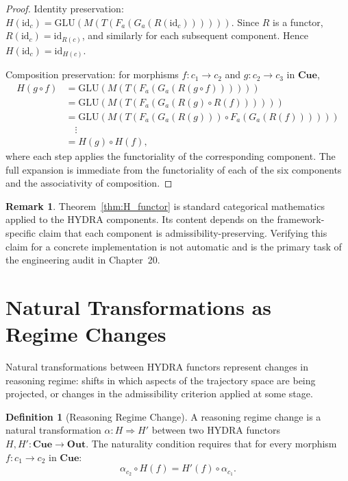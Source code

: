 \documentclass[12pt, oneside]{book}
\theoremstyle{flyxion}
\theoremstyle{definition}
\newtheorem{definition}[theorem]{Definition}
\newtheorem{remark}[theorem]{Remark}
\begin{document}
\begin{proof}
Identity preservation: $H(\mathrm{id}_c) =
\mathrm{GLU}(M(T(F_a(G_a(R(\mathrm{id}_c))))))$.
Since $R$ is a functor, $R(\mathrm{id}_c) = \mathrm{id}_{R(c)}$,
and similarly for each subsequent component. Hence
$H(\mathrm{id}_c) = \mathrm{id}_{H(c)}$.

Composition preservation: for morphisms $f : c_1 \to c_2$
and $g : c_2 \to c_3$ in $\mathbf{Cue}$,
\begin{align*}
H(g \circ f)
&= \mathrm{GLU}(M(T(F_a(G_a(R(g \circ f)))))) \\
&= \mathrm{GLU}(M(T(F_a(G_a(R(g) \circ R(f)))))) \\
&= \mathrm{GLU}(M(T(F_a(G_a(R(g))) \circ
   F_a(G_a(R(f)))))) \\
&\quad\vdots \\
&= H(g) \circ H(f),
\end{align*}
where each step applies the functoriality of the
corresponding component. The full expansion is
immediate from the functoriality of each of the six
components and the associativity of composition.
\end{proof}

\begin{remark}
Theorem~\ref{thm:H_functor} is standard categorical
mathematics applied to the HYDRA components. Its content
depends on the framework-specific claim that each component
is admissibility-preserving. Verifying this claim for a
concrete implementation is not automatic and is the primary
task of the engineering audit in Chapter~20.
\end{remark}

\section{Natural Transformations as Regime Changes}

Natural transformations between HYDRA functors represent
changes in reasoning regime: shifts in which aspects of
the trajectory space are being projected, or changes in
the admissibility criterion applied at some stage.

\begin{definition}[Reasoning Regime Change]
A reasoning regime change is a natural transformation
$\alpha : H \Rightarrow H'$ between two HYDRA functors
$H, H' : \mathbf{Cue} \to \mathbf{Out}$. The
naturality condition requires that for every morphism
$f : c_1 \to c_2$ in $\mathbf{Cue}$:
\[
\alpha_{c_2} \circ H(f) = H'(f) \circ \alpha_{c_1}.
\]
\end{definition}
\end{document}
